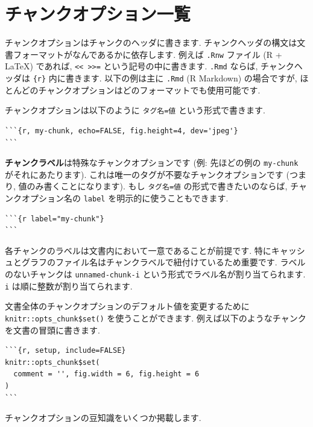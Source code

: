 \documentclass[
  11pt,
  lualatex,
  ja=standard]{bxjsreport}
\begin{document}
\hypertarget{chunk-options-full}{%
\section{チャンクオプション一覧}\label{chunk-options-full}}

チャンクオプションはチャンクのヘッダに書きます. チャンクヘッダの構文は文書フォーマットがなんであるかに依存します. 例えば \texttt{.Rnw} ファイル (R + LaTeX) であれば, \texttt{\textless{}\textless{}\ \textgreater{}\textgreater{}=} という記号の中に書きます. \texttt{.Rmd} ならば, チャンクヘッダは \texttt{\textasciigrave{}\textasciigrave{}\textasciigrave{}\{r\}} 内に書きます. 以下の例は主に \texttt{.Rmd} (R Markdown) の場合ですが, ほとんどのチャンクオプションはどのフォーマットでも使用可能です.

チャンクオプションは以下のように \texttt{タグ名=値} という形式で書きます.

\begin{verbatim}
```{r, my-chunk, echo=FALSE, fig.height=4, dev='jpeg'}
```
\end{verbatim}

\textbf{チャンクラベル}は特殊なチャンクオプションです (例: 先ほどの例の \texttt{my-chunk} がそれにあたります). これは唯一のタグが不要なチャンクオプションです (つまり, 値のみ書くことになります). もし \texttt{タグ名=値} の形式で書きたいのならば, チャンクオプション名の \texttt{label} を明示的に使うこともできます.

\begin{verbatim}
```{r label="my-chunk"}
```
\end{verbatim}

各チャンクのラベルは文書内において一意であることが前提です. 特にキャッシュとグラフのファイル名はチャンクラベルで紐付けているため重要です. ラベルのないチャンクは \texttt{unnamed-chunk-i} という形式でラベル名が割り当てられます. \texttt{i} は順に整数が割り当てられます.

文書全体のチャンクオプションのデフォルト値を変更するために \texttt{knitr::opts\_chunk\$set()} を使うことができます. 例えば以下のようなチャンクを文書の冒頭に書きます.

\begin{verbatim}
```{r, setup, include=FALSE}
knitr::opts_chunk$set(
  comment = '', fig.width = 6, fig.height = 6
)
```
\end{verbatim}

チャンクオプションの豆知識をいくつか掲載します.
\end{document}
